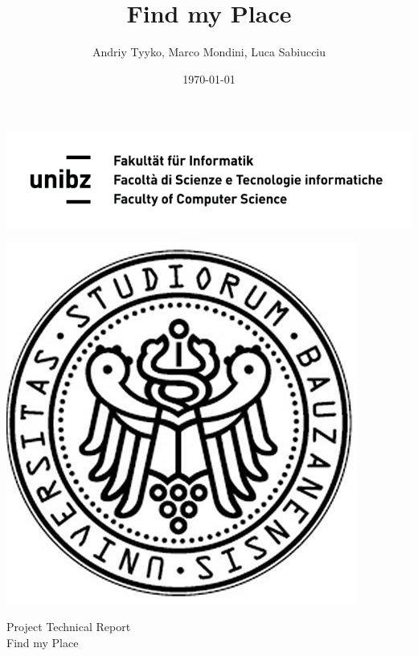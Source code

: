 \documentclass[12pt,letterpaper, onecolumn]{article}
\author{Andriy Tyyko, Marco Mondini, Luca Sabiucciu}
\title{\Huge{Find my Place}\\ \Large{{\it }}}
\date{\today}
\begin{document}
	\begin{titlepage}
		\begin{minipage}{0.5\textwidth}
			\begin{flushleft}
				\includegraphics[scale=0.5]{Images/faculty_logo.jpg}
			\end{flushleft}
		\end{minipage}
		\begin{minipage}{0.5\textwidth}
			\begin{flushright}
				\includegraphics[scale=0.3]{Images/unibz_logo.JPG}
			\end{flushright}
		\end{minipage}
		\vspace{3.5cm}
		\begin{center}
			{\Large Project Technical Report}
			\vspace{1cm} \\
			{\huge Find my Place}
			\vspace{0.5cm}\\
			{\Large  }
			\vspace{3cm}

\end{center}
\end{titlepage}
\end{document}
